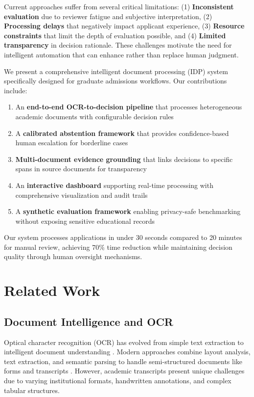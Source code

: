 \documentclass{article}
\begin{document}
Current approaches suffer from several critical limitations: (1) \textbf{Inconsistent evaluation} due to reviewer fatigue and subjective interpretation, (2) \textbf{Processing delays} that negatively impact applicant experience, (3) \textbf{Resource constraints} that limit the depth of evaluation possible, and (4) \textbf{Limited transparency} in decision rationale. These challenges motivate the need for intelligent automation that can enhance rather than replace human judgment.

We present a comprehensive intelligent document processing (IDP) system specifically designed for graduate admissions workflows. Our contributions include:

\begin{enumerate}
    \item An \textbf{end-to-end OCR-to-decision pipeline} that processes heterogeneous academic documents with configurable decision rules
    \item A \textbf{calibrated abstention framework} that provides confidence-based human escalation for borderline cases
    \item \textbf{Multi-document evidence grounding} that links decisions to specific spans in source documents for transparency
    \item An \textbf{interactive dashboard} supporting real-time processing with comprehensive visualization and audit trails
    \item A \textbf{synthetic evaluation framework} enabling privacy-safe benchmarking without exposing sensitive educational records
\end{enumerate}

Our system processes applications in under 30 seconds compared to 20 minutes for manual review, achieving 70\% time reduction while maintaining decision quality through human oversight mechanisms.

\section{Related Work}

\subsection{Document Intelligence and OCR}

Optical character recognition (OCR) has evolved from simple text extraction to intelligent document understanding \cite{survey_ocr_2021}. Modern approaches combine layout analysis, text extraction, and semantic parsing to handle semi-structured documents like forms and transcripts \cite{layoutlm_2020}. However, academic transcripts present unique challenges due to varying institutional formats, handwritten annotations, and complex tabular structures.
\end{document}
